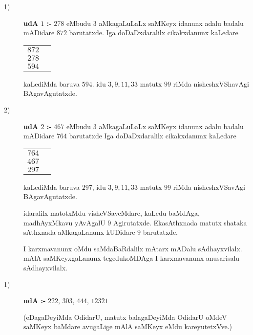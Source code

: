 \begin{description}
\item[{\rm 1)}] {\bf udA $1$ :-} $278$ eMbudu $3$ aMkagaLuLaLx saMKeyx idanunx adalu badalu mADidare $872$ barutatxde. Iga doDaDxdaralilx cikakxdanunx kaLedare
    \begin{center}
\begin{tabular}{cc}
  $872$&\\
  $278$&\\\cline{1-1}
  $594$&
\end{tabular}
    \end{center}
    kaLediMda baruva $594$. idu $3, 9, 11, 33$ matutx $99$ riMda nisheshxVShavAgi BAgavAgutatxde.
    
  \item[{\rm 2)}]  {\bf udA $2$ :-} $467$ eMbudu $3$ aMkagaLuLaLx saMKeyx idanunx adalu badalu mADidare $764$ barutatxde Iga doDaDxdaralilx cikakxdanunx kaLedare
        \begin{center}
\begin{tabular}{cc}
  $764$&\\
  $467$&\\\cline{1-1}
  $297$&
\end{tabular}
        \end{center}
        kaLediMda baruva $297$, idu $3, 9, 11, 33$ matutx $99$ riMda nisheshxVSavAgi BAgavAgutatxde.

        idaralilx matotxMdu visheVSaveMdare, kaLedu baMdAga, madhAyxMkavu yAvAgalU $9$ Agirutatxde. EkasAthxnada matutx shataka sAthxnada aMkagaLanunx kUDidare $9$ barutatxde.

        I karxmavanunx oMdu saMdaBaRdalilx mAtarx mADalu sAdhayxvilalx. mAlA saMKeyxgaLanunx tegedukoMDAga I karxmavanunx anusarisalu sAdhayxvilalx.
\end{description}

        \begin{description}
        \item[{\rm 1)}] {\bf udA :-} $222$, $303$, $444$, $12321$

          (eDagaDeyiMda OdidarU, matutx balagaDeyiMda OdidarU oMdeV saMKeyx baMdare avugaLige mAlA saMKeyx eMdu kareyutetxVve.)
        \end{description}
        
  



